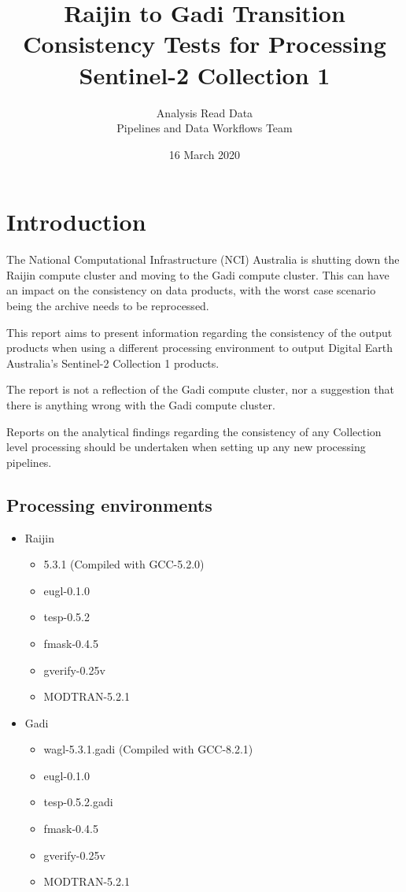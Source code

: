 \documentclass[a4paper]{article}
\title{Raijin to Gadi Transition Consistency Tests for Processing Sentinel-2 Collection 1}
\date{16 March 2020}
\author{Analysis Read Data\\ Pipelines and Data Workflows Team}
\begin{document}
  \maketitle
  \newpage

  \section{Introduction}

    \begin{flushleft}
      The National Computational Infrastructure (NCI) Australia is shutting down the Raijin compute cluster and moving to the Gadi compute cluster. This can have an impact on the consistency on data products, with the worst case scenario being the archive needs to be reprocessed. \par
      This report aims to present information regarding the consistency of the output products when using a different processing environment to output Digital Earth Australia's Sentinel-2 Collection 1 products. \par
      The report is not a reflection of the Gadi compute cluster, nor a suggestion that there is anything wrong with the Gadi compute cluster. \par
      Reports on the analytical findings regarding the consistency of any Collection level processing should be undertaken when setting up any new processing pipelines.
    \end{flushleft}

    \subsection{Processing environments}
    \label{sec:environ}
      \begin{itemize}
        \item Raijin
          \begin{itemize}
            \item 5.3.1 (Compiled with GCC-5.2.0)
            \item eugl-0.1.0
            \item tesp-0.5.2
            \item fmask-0.4.5
            \item gverify-0.25v
            \item MODTRAN-5.2.1
          \end{itemize}
        \item Gadi
          \begin{itemize}
            \item wagl-5.3.1.gadi (Compiled with GCC-8.2.1)
            \item eugl-0.1.0
            \item tesp-0.5.2.gadi
            \item fmask-0.4.5
            \item gverify-0.25v
            \item MODTRAN-5.2.1
          \end{itemize}
      \end{itemize}
\end{document}
